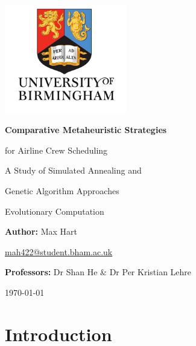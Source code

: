\documentclass[12pt]{article}
\begin{document}
\begin{titlepage}
    \centering
    \vspace*{1cm}
    
    \includegraphics[width=0.4\textwidth]{UoB.jpg}\par\vspace{1cm}
    
    {\LARGE\bfseries Comparative Metaheuristic Strategies\par for Airline Crew Scheduling\par}
    \vspace{0.5cm}
    {\Large A Study of Simulated Annealing and\par Genetic Algorithm Approaches\par}
    \vspace{0.75cm}
    
    {\large Evolutionary Computation\par}
    \vspace{1.5cm}
    
    {\large\textbf{Author:} Max Hart\par}
    \vspace{0.3cm}
    {\normalsize \href{mailto:mah422@student.bham.ac.uk}{mah422@student.bham.ac.uk}\par}
    \vspace{1.5cm}
    
    {\large\textbf{Professors:} Dr Shan He \& Dr Per Kristian Lehre\par}
    \vspace{1cm}
    
    {\large \today\par}
    
\end{titlepage}

\tableofcontents

\newpage

\section{Introduction}
\end{document}
